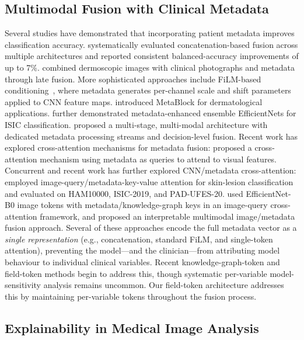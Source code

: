 \documentclass[12pt, a4paper]{article}
\begin{document}
\subsection{Multimodal Fusion with Clinical Metadata}

Several studies have demonstrated that incorporating patient metadata improves classification accuracy. \citet{pacheco2020impact} systematically evaluated concatenation-based fusion across multiple architectures and reported consistent balanced-accuracy improvements of up to 7\%. \citet{yap2018multimodal} combined dermoscopic images with clinical photographs and metadata through late fusion. More sophisticated approaches include FiLM-based conditioning~\citep{perez2018film}, where metadata generates per-channel scale and shift parameters applied to CNN feature maps. \citet{pacheco2021metablock} introduced MetaBlock for dermatological applications. \citet{gessert2020metadata} further demonstrated metadata-enhanced ensemble EfficientNets for ISIC classification. \citet{tang2022fusionm4net} proposed a multi-stage, multi-modal architecture with dedicated metadata processing streams and decision-level fusion. Recent work has explored cross-attention mechanisms for metadata fusion: \citet{erdem2026crossmeta} proposed a cross-attention mechanism using metadata as queries to attend to visual features. Concurrent and recent work has further explored CNN/metadata cross-attention: \citet{tranvan2025multimodal} employed image-query/metadata-key-value attention for skin-lesion classification and evaluated on HAM10000, ISIC-2019, and PAD-UFES-20. \citet{waseem2026multimodal} used EfficientNet-B0 image tokens with metadata/knowledge-graph keys in an image-query cross-attention framework, and \citet{sonuc2026interpretable} proposed an interpretable multimodal image/metadata fusion approach. Several of these approaches encode the full metadata vector as a \emph{single representation} (e.g., concatenation, standard FiLM, and single-token attention), preventing the model---and the clinician---from attributing model behaviour to individual clinical variables. Recent knowledge-graph-token and field-token methods begin to address this, though systematic per-variable model-sensitivity analysis remains uncommon. Our field-token architecture addresses this by maintaining per-variable tokens throughout the fusion process.

\subsection{Explainability in Medical Image Analysis}
\end{document}
